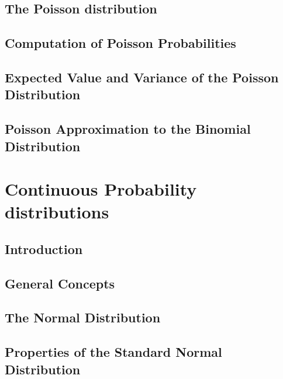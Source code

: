 \documentclass[12pt,]{article}
\theoremstyle{definition}
\theoremstyle{definition}
\theoremstyle{definition}
\theoremstyle{remark}
\begin{document}
\subsection{The Poisson distribution}\label{the-poisson-distribution}

\subsection{Computation of Poisson
Probabilities}\label{computation-of-poisson-probabilities}

\subsection{Expected Value and Variance of the Poisson
Distribution}\label{expected-value-and-variance-of-the-poisson-distribution}

\subsection{Poisson Approximation to the Binomial
Distribution}\label{poisson-approximation-to-the-binomial-distribution}

\section{Continuous Probability
distributions}\label{continuous-probability-distributions}

\subsection{Introduction}\label{introduction-3}

\subsection{General Concepts}\label{general-concepts}

\subsection{The Normal Distribution}\label{the-normal-distribution}

\subsection{Properties of the Standard Normal
Distribution}\label{properties-of-the-standard-normal-distribution}
\end{document}

